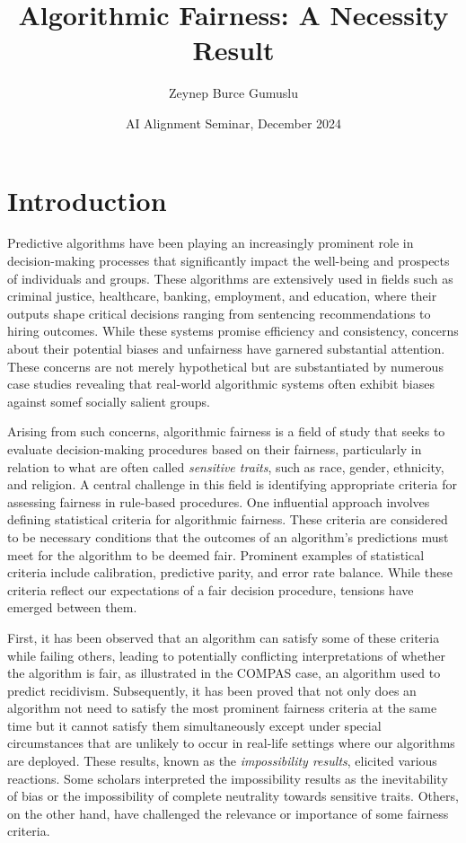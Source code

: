 \documentclass{article}
\title{Algorithmic Fairness: A Necessity Result}
\author{Zeynep Burce Gumuslu}
\date{AI Alignment Seminar, December 2024}
\begin{document}
\maketitle
\section{Introduction}

Predictive algorithms have been playing an increasingly prominent role in decision-making processes that significantly impact the well-being and prospects of individuals and groups. These algorithms are extensively used in fields such as criminal justice, healthcare, banking, employment, and education, where their outputs shape critical decisions ranging from sentencing recommendations to hiring outcomes. While these systems promise efficiency and consistency, concerns about their potential biases and unfairness have garnered substantial attention. These concerns are not merely hypothetical but are substantiated by numerous case studies revealing that real-world algorithmic systems often exhibit biases against somef socially salient groups.

Arising from such concerns, algorithmic fairness is a field of study that seeks to evaluate decision-making procedures based on their fairness, particularly in relation to what are often called \textit{sensitive traits}, such as race, gender, ethnicity, and religion. A central challenge in this field is identifying appropriate criteria for assessing fairness in rule-based procedures. One influential approach involves defining statistical criteria for algorithmic fairness. These criteria are considered to be necessary conditions that the outcomes of an algorithm’s predictions must meet for the algorithm to be deemed fair. Prominent examples of statistical criteria include calibration, predictive parity, and error rate balance. While these criteria reflect our expectations of a fair decision procedure, tensions have emerged between them.

First, it has been observed that an algorithm can satisfy some of these criteria while failing others, leading to potentially conflicting interpretations of whether the algorithm is fair, as illustrated in the COMPAS case, an algorithm used to predict recidivism. Subsequently, it has been proved that not only does an algorithm not need to satisfy the most prominent fairness criteria at the same time but it cannot satisfy them simultaneously except under special circumstances that are unlikely to occur in real-life settings where our algorithms are deployed. These results, known as the \textit{impossibility results}, elicited various reactions. Some scholars interpreted the impossibility results as the inevitability of bias or the impossibility of complete neutrality towards sensitive traits. Others, on the other hand, have challenged the relevance or importance of some fairness criteria. 
\end{document}
